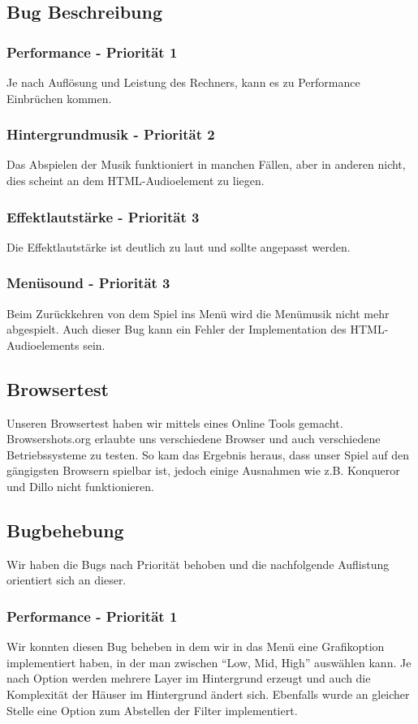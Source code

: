 \subsection{Bug Beschreibung}
\subsubsection{Performance - Priorität 1}
Je nach Auflösung und Leistung des Rechners, kann es zu Performance Einbrüchen kommen.
\subsubsection{Hintergrundmusik - Priorität 2}
Das Abspielen der Musik funktioniert in manchen Fällen, aber in anderen nicht, dies scheint an dem HTML-Audioelement zu liegen.
\subsubsection{Effektlautstärke - Priorität 3}
Die Effektlautstärke ist deutlich zu laut und sollte angepasst werden. 
\subsubsection{Menüsound - Priorität 3}
Beim Zurückkehren von dem Spiel ins Menü wird die Menümusik nicht mehr abgespielt. Auch dieser Bug kann ein Fehler der Implementation des HTML-Audioelements sein.
\subsection{Browsertest}
Unseren Browsertest haben wir mittels eines Online Tools gemacht. Browsershots.org \cite{browsershots} erlaubte uns verschiedene Browser und auch verschiedene Betriebssysteme zu testen. So kam das Ergebnis heraus, dass unser Spiel auf den gängigsten Browsern spielbar ist, jedoch einige Ausnahmen wie z.B. Konqueror und Dillo nicht funktionieren.
\subsection{Bugbehebung}
Wir haben die Bugs nach Priorität behoben und die nachfolgende Auflistung orientiert sich an dieser.
\subsubsection{Performance - Priorität 1}
Wir konnten diesen Bug beheben in dem wir in das Menü eine Grafikoption implementiert haben, in der man zwischen ``Low, Mid, High'' auswählen kann. Je nach Option werden mehrere Layer im Hintergrund erzeugt und auch die Komplexität der Häuser im Hintergrund ändert sich. Ebenfalls wurde an gleicher Stelle eine Option zum Abstellen der Filter implementiert.
